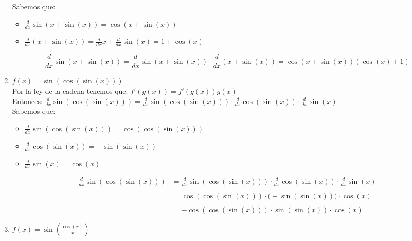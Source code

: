\documentclass[12pt]{article}
\begin{document}
\begin{enumerate}[\hspace{9px} a)]
        Sabemos que:
        \begin{itemize}
            \item \(\displaystyle\frac{d}{dx}\sin(x+\sin(x))=\cos(x+\sin(x))\)
            \item \(\displaystyle\frac{d}{dx}(x+\sin(x))=\frac{d}{dx}x+\frac{d}{dx}\sin(x)=1+\cos(x)\)
        \end{itemize}

        \begin{equation*}
            \frac{d}{dx}\sin(x+\sin(x))=\frac{d}{dx}\sin(x+\sin(x))\cdot\frac{d}{dx}(x+\sin(x))=\cos(x+\sin(x))(\cos(x)+1)
        \end{equation*}
    \item \(f(x) = \sin(\cos(\sin(x)))\)\\

        Por la ley de la cadena tenemos que: \(f'(g(x))=f'(g(x))g(x)\)\\

        Entonces: \quad \(\displaystyle\frac{d}{dx}\sin(\cos(\sin(x)))=\frac{d}{dx}\sin(\cos(\sin(x)))\cdot\frac{d}{dx}\cos(\sin(x))\cdot\frac{d}{dx}\sin(x)\)\\

        Sabemos que:
        \begin{itemize}
            \item \(\displaystyle\frac{d}{dx}\sin(\cos(\sin(x)))=\cos(\cos(\sin(x)))\)
            \item \(\displaystyle\frac{d}{dx}\cos(\sin(x))=-\sin(\sin(x))\)
            \item \(\displaystyle\frac{d}{dx}\sin(x)=\cos(x)\)
        \end{itemize}

        \begin{align*}
            \displaystyle\frac{d}{dx}\sin(\cos(\sin(x)))&=\frac{d}{dx}\sin(\cos(\sin(x)))\cdot\frac{d}{dx}\cos(\sin(x))\cdot\frac{d}{dx}\sin(x)\\ \\
            &=\cos(\cos(\sin(x)))\cdot\big(-\sin(\sin(x))\big)\cdot\cos(x)\\ \\
            &=-\cos(\cos(\sin(x)))\cdot\sin(\sin(x))\cdot\cos(x)
        \end{align*}
    \item \(f(x) = \sin\left(\displaystyle\frac{\cos(x)}{x}\right)\)\\


\end{enumerate}
\end{document}
